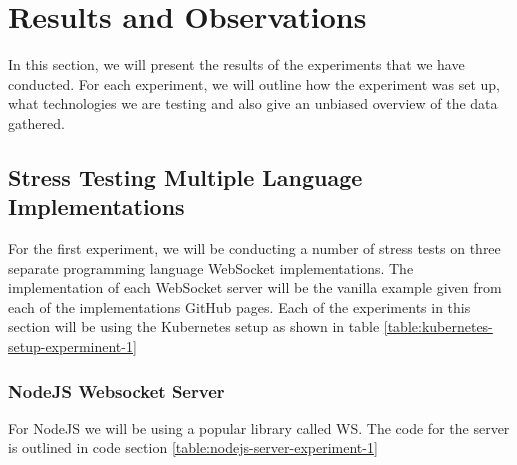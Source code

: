 \chapter{Results and Observations}

In this section, we will present the results of the experiments that we have conducted. For each experiment, we will outline how the experiment was set up, what technologies we are testing and also give an unbiased overview of the data gathered.

\section{Stress Testing Multiple Language Implementations}

For the first experiment, we will be conducting a number of stress tests on three separate programming language WebSocket implementations. The implementation of each WebSocket server will be the vanilla example given from each of the implementations GitHub pages. Each of the experiments in this section will be using the  Kubernetes setup as shown in table \ref{table:kubernetes-setup-experminent-1}

\begin{table}[H]
\caption{Kubernetes Setup}
\label{table:kubernetes-setup-experminent-1}
\end{table}

\subsection{NodeJS Websocket Server}

For NodeJS we will be using a popular library called WS. The code for the server is outlined in code section \ref{table:nodejs-server-experiment-1}

